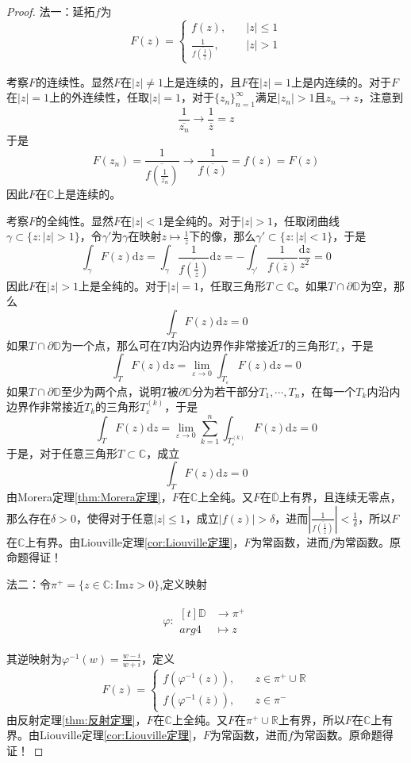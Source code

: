 \documentclass[lang = cn, scheme = chinese, thmcnt = section]{elegantbook}
\newcommand{\R}{\mathbb{R}}            %
\newcommand{\C}{\mathbb{C}}  		   %
\newcommand{\sub}{\subset}             %
\newcommand{\function}[5]{
	\begin{align*}
		#1:\begin{aligned}[t]
			#2 &\longrightarrow #3\\
			#4 &\longmapsto #5
		\end{aligned}
	\end{align*}
}                                     %
\begin{document}
\begin{proof}
	法一：延拓$f$为
	$$
	F(z)=\begin{cases}
		f(z),\quad & |z|\le 1\\
		\frac{1}{\overline{f(\frac{1}{\overline{z}})}},\quad & |z|>1
	\end{cases}
	$$
	
	考察$F$的连续性。显然$F$在$|z|\ne 1$上是连续的，且$F$在$|z|=1$上是内连续的。对于$F$在$|z|=1$上的外连续性，任取$|z|=1$，对于$\{z_n\}_{n=1}^{\infty}$满足$|z_n|>1$且$z_n\to z$，注意到
	$$
	\frac{1}{\overline{z_n}}\to\frac{1}{\overline{z}}=z
	$$
	于是
	$$
	F(z_n)=\frac{1}{\overline{f(\frac{1}{\overline{z_n}})}}\to\frac{1}{\overline{f(z)}}=f(z)=F(z)
	$$
	因此$F$在$\C$上是连续的。
	
	考察$F$的全纯性。显然$F$在$|z|<1$是全纯的。对于$|z|>1$，任取闭曲线$\gamma\sub\{z:|z|>1\}$，令$\gamma'$为$\gamma$在映射$z\mapsto\frac{1}{z}$下的像，那么$\gamma'\sub\{z:|z|<1\}$，于是
	$$
	\int_\gamma{F(z)\mathrm{d}z}
	=\int_\gamma{\frac{1}{\overline{f(\frac{1}{\overline{z}})}}\mathrm{d}z}
	=-\int_{\gamma'}{\frac{1}{\overline{f(\overline{z})}}\frac{\mathrm{d}z}{z^2}}
	=0
	$$
	因此$F$在$|z|>1$上是全纯的。对于$|z|=1$，任取三角形$T\sub\C$。如果$T\cap \partial \mathbb{D}$为空，那么
	$$
	\int_{T}{F(z)\mathrm{d}z}=0
	$$
	如果$T\cap \partial \mathbb{D}$为一个点，那么可在$T$内沿内边界作非常接近$T$的三角形$T_\varepsilon$，于是
	$$
	\int_{T}{F(z)\mathrm{d}z}=\lim_{\varepsilon\to0}\int_{T_\varepsilon}{F(z)\mathrm{d}z}=0
	$$
	如果$T\cap \partial \mathbb{D}$至少为两个点，说明$T$被$\partial \mathbb{D}$分为若干部分$T_1,\cdots,T_n$，在每一个$T_k$内沿内边界作非常接近$T_k$的三角形$T^{(k)}_\varepsilon$​，于是
	$$
	\int_{T}{F(z)\mathrm{d}z}=\lim_{\varepsilon\to0}\sum_{k=1}^{n}\int_{T^{(k)}_\varepsilon}{F(z)\mathrm{d}z}=0
	$$
	于是，对于任意三角形$T\sub \C$​，成立
	$$
	\int_{T}{F(z)\mathrm{d}z}=0
	$$
	由Morera定理\ref{thm:Morera定理}，$F$在$\C$上全纯。又$F$在$\overline{\mathbb{D}}$上有界，且连续无零点，那么存在$\delta>0$，使得对于任意$|z|\le 1$，成立$|f(z)|>\delta$，进而$\left|\frac{1}{\overline{f(\frac{1}{\overline{z}})}}\right|<\frac{1}{\delta}$，所以$F$在$\C$上有界。由Liouville定理\ref{cor:Liouville定理}，$F$为常函数，进而$f$为常函数。原命题得证！
	
	法二：令$\pi^+=\{z\in\C:\text{Im} z>0 \}$,定义映射
	\function{\varphi}{\mathbb{D}}{\pi^+}{arg4}{z}
	其逆映射为$\varphi^{-1}(w)=\frac{w-i}{w+i}$，定义
	$$
	F(z)=\begin{cases}
		f(\varphi^{-1}(z)),\quad & z\in\pi^+\cup\R\\
		f(\varphi^{-1}(\overline{z})),\quad & z\in\pi^-
	\end{cases}
	$$
	由反射定理\ref{thm:反射定理}，$F$在$\C$上全纯。又$F$在$\pi^+\cup\R$上有界，所以$F$在$\C$上有界。由Liouville定理\ref{cor:Liouville定理}，$F$为常函数，进而$f$为常函数。原命题得证！
\end{proof}
\end{document}
